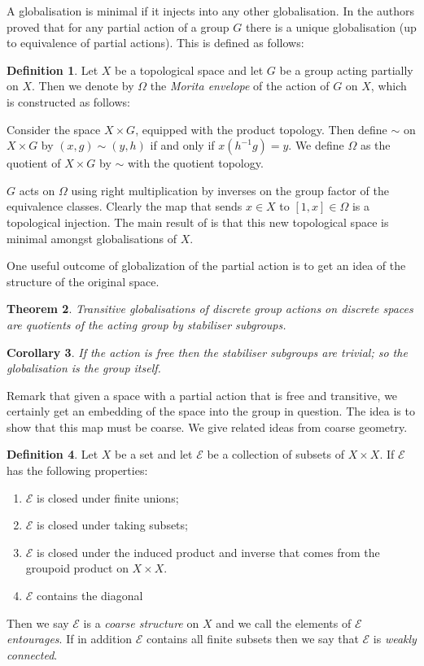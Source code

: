 \documentclass[11pt,a4paper]{amsart}
\theoremstyle{plain}
\newtheorem{theorem}{Theorem}%
\newtheorem{corollary}[theorem]{Corollary}%
\theoremstyle{definition}%
\newtheorem{definition}[theorem]{Definition}%
\theoremstyle{remark}%
\begin{document}
A globalisation is minimal if it injects into any other globalisation. In \cite{MR2041539} the authors proved that for any partial action of a group $G$ there is a unique globalisation (up to equivalence of partial actions). This is defined as follows:

\begin{definition}
Let $X$ be a topological space and let $G$ be a group acting partially on $X$. Then we denote by $\Omega$ the \textit{Morita envelope} of the action of $G$ on $X$, which is constructed as follows:

Consider the space $X\times G$, equipped with the product topology. Then define $\sim$ on $X\times G$ by $(x,g)\sim (y,h)$ if and only if $x(h^{-1}g)=y$. We define $\Omega$ as the quotient of $X\times G$ by $\sim$ with the quotient topology. 

$G$ acts on $\Omega$ using right multiplication by inverses on the group factor of the equivalence classes. Clearly the map that sends $x \in X$ to $[1,x] \in \Omega$ is a topological injection. The main result of \cite{MR2041539} is that this new topological space is minimal amongst globalisations of $X$.
\end{definition}

One useful outcome of globalization of the partial action is to get an idea of the structure of the original space.

\begin{theorem}\label{Thm:Free}
Transitive globalisations of discrete group actions on discrete spaces are quotients of the acting group by stabiliser subgroups.
\end{theorem}

\begin{corollary}\label{Cor:FreeTrans}
If the action is free then the stabiliser subgroups are trivial; so the globalisation is the group itself.
\end{corollary}

Remark that given a space with a partial action that is free and transitive, we certainly get an embedding of the space into the group in question. The idea is to show that this map must be coarse. We give related ideas from coarse geometry.
\begin{definition}
Let $X$ be a set and let $\mathcal{E}$ be a collection of subsets of $X \times X$. If $\mathcal{E}$ has the following properties:
\begin{enumerate}
\item $\mathcal{E}$ is closed under finite unions;
\item $\mathcal{E}$ is closed under taking subsets;
\item $\mathcal{E}$ is closed under the induced product and inverse that comes from the groupoid product on $X \times X$.
\item $\mathcal{E}$ contains the diagonal
\end{enumerate}
Then we say $\mathcal{E}$ is a \textit{coarse structure} on $X$ and we call the elements of $\mathcal{E}$ \textit{entourages}. If in addition $\mathcal{E}$ contains all finite subsets then we say that $\mathcal{E}$ is \textit{weakly connected}.
\end{definition}
\end{document}
